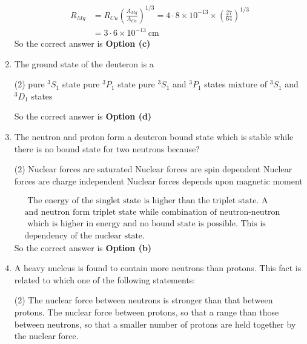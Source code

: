 \begin{enumerate}
\begin{answer}
	$$
	\begin{aligned}
 R_{M g}&=R_{C u}\left(\frac{A_{M g}}{A_{C u}}\right)^{1 / 3}=4 \cdot 8 \times 10^{-13} \times\left(\frac{27}{64}\right)^{1 / 3}\\
	&=3 \cdot 6 \times 10^{-13} \mathrm{~cm}
\end{aligned}
$$
So the correct answer is \textbf{Option (c)}
\end{answer}
	\item The ground state of the deuteron is a
	 \begin{tasks}(2)
		\task[\textbf{a.}]pure ${ }^3 S_1$ state
		\task[\textbf{b.}]pure ${ }^3 P_1$ state
		\task[\textbf{c.}] pure ${ }^3 S_1$ and ${ }^3 P_1$ states
		\task[\textbf{d.}] mixture of ${ }^3 S_1$ and ${ }^3 D_1$ states
	\end{tasks}
\begin{answer}
So the correct answer is \textbf{Option (d)}
\end{answer}
	\item The neutron and proton form a deuteron bound state which is stable while there is no bound state for two neutrons because?
	 \begin{tasks}(2)
		\task[\textbf{a.}]Nuclear forces are saturated
		\task[\textbf{b.}]Nuclear forces are spin dependent
		\task[\textbf{c.}]Nuclear forces are charge independent
		\task[\textbf{d.}] Nuclear forces depends upon magnetic moment
	\end{tasks}
\begin{answer}
	$$
	\begin{aligned}
	&\text{ The energy of the singlet state is higher than the triplet state. A combination of proton }\\
	&\text{and neutron form triplet state while combination of neutron-neutron forms singlet state,}\\
	&\text{ which is higher in energy and no bound state is possible. This is confirming the spin }\\
	&\text{dependency of the nuclear state.}
\end{aligned}
$$
So the correct answer is \textbf{Option (b)}
\end{answer}
	\item A heavy nucleus is found to contain more neutrons than protons. This fact is related to which one of the following statements:
	 \begin{tasks}(2)
		\task[\textbf{a.}]The nuclear force between neutrons is stronger than that between protons.
		\task[\textbf{b.}]The nuclear force between protons, so that a range than those between neutrons, so that a smaller number of protons are held together by the nuclear force.

\end{tasks}
\end{enumerate}
